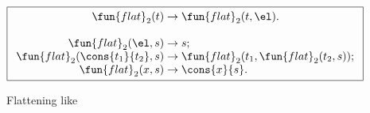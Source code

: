 
\begin{figure}[t]
\begin{equation*}
\boxed{
\begin{array}{r@{\;}c@{\;}l}
\fun{flat}_2(t) & \rightarrow & \fun{flat}_2(t,\el).\\
\\
\fun{flat}_2(\el,s) & \rightarrow & s;\\
\fun{flat}_2(\cons{t_1}{t_2},s)
  & \rightarrow & \fun{flat}_2(t_1,\fun{flat}_2(t_2,s));\\
\fun{flat}_2(x,s) & \rightarrow & \cons{x}{s}.
\end{array}}
\end{equation*}
\caption{Flattening like }
\label{fig:flat2}
\end{figure}

\label{inorder}

